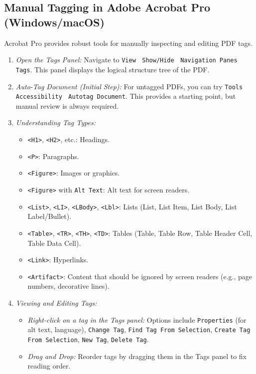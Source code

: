 \begin{itemize}
\subsection{Manual Tagging in Adobe Acrobat Pro (Windows/macOS)}
\label{subsec:manual-tagging-acrobat}
Acrobat Pro provides robust tools for manually inspecting and editing PDF tags.

\begin{enumerate}
\item \emph{Open the Tags Panel:} Navigate to \texttt{View} $\>$ \texttt{Show/Hide} $\>$ \texttt{Navigation Panes} $\>$ \texttt{Tags}. This panel displays the logical structure tree of the PDF.
\item \emph{Auto-Tag Document (Initial Step):} For untagged PDFs, you can try \texttt{Tools} $\>$ \texttt{Accessibility} $\>$ \texttt{Autotag Document}. This provides a starting point, but manual review is always required.
\item \emph{Understanding Tag Types:}
    \begin{itemize}
    \item \texttt{<H1>}, \texttt{<H2>}, etc.: Headings.
    \item \texttt{<P>}: Paragraphs.
    \item \texttt{<Figure>}: Images or graphics.
    \item \texttt{<Figure>} with \texttt{Alt Text}: Alt text for screen readers.
    \item \texttt{<List>}, \texttt{<LI>}, \texttt{<LBody>}, \texttt{<Lbl>}: Lists (List, List Item, List Body, List Label/Bullet).
    \item \texttt{<Table>}, \texttt{<TR>}, \texttt{<TH>}, \texttt{<TD>}: Tables (Table, Table Row, Table Header Cell, Table Data Cell).
    \item \texttt{<Link>}: Hyperlinks.
    \item \texttt{<Artifact>}: Content that should be ignored by screen readers (e.g., page numbers, decorative lines).
    \end{itemize}
\item \emph{Viewing and Editing Tags:}
    \begin{itemize}
    \item \emph{Right-click on a tag in the Tags panel:} Options include \texttt{Properties} (for alt text, language), \texttt{Change Tag}, \texttt{Find Tag From Selection}, \texttt{Create Tag From Selection}, \texttt{New Tag}, \texttt{Delete Tag}.
    \item \emph{Drag and Drop:} Reorder tags by dragging them in the Tags panel to fix reading order.

\end{itemize}
\end{enumerate}
\end{itemize}
